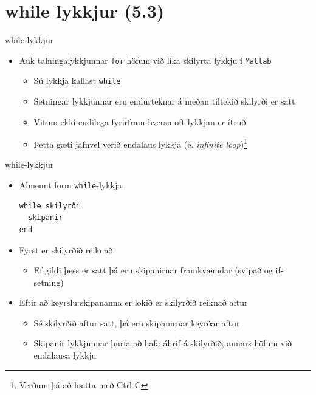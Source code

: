\documentclass{beamer}
\begin{document}
\section{while lykkjur (5.3)}

\begin{frame}{while-lykkjur}
\begin{itemize}
 \item Auk talningalykkjunnar \texttt{for} höfum við líka skilyrta lykkju í \texttt{Matlab}
 \begin{itemize}
  \item Sú lykkja kallast \texttt{while}
  \item Setningar lykkjunnar eru endurteknar á meðan tiltekið skilyrði er satt
  \item Vitum ekki endilega fyrirfram hversu oft lykkjan er ítruð
  \item Þetta gæti jafnvel verið endalaus lykkja (e. \emph{infinite loop})\footnote{Verðum þá að hætta með Ctrl-C}
 \end{itemize}
\end{itemize}
\end{frame}

\begin{frame}[fragile]{while-lykkjur}
\begin{itemize}
 \item Almennt form \texttt{while}-lykkja:
\begin{verbatim}
while skilyrði
  skipanir
end
\end{verbatim}
\pause
 \item Fyrst er skilyrðið reiknað
 \begin{itemize}
  \item Ef gildi þess er satt þá eru skipanirnar framkvæmdar (svipað og if-setning)
 \end{itemize}
 \item Eftir að keyrslu skipananna er lokið er skilyrðið reiknað aftur
 \begin{itemize}
  \item Sé skilyrðið aftur satt, þá eru skipanirnar keyrðar aftur
  \item Skipanir lykkjunnar þurfa að hafa áhrif á skilyrðið, annars höfum við endalausa lykkju
 \end{itemize}
\end{itemize}
\end{frame}
\end{document}
